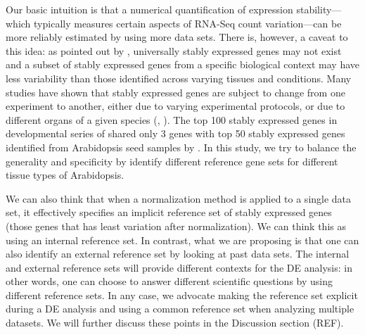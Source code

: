 \documentclass[11pt, a4paper]{article}
\begin{document}
Our basic intuition is that a numerical quantification of expression
stability---which typically measures certain aspects of RNA-Seq count
variation---can be more reliably estimated by using more data sets.  There is,
however, a caveat to this idea: as pointed out by \cite{hruz2011refgenes},
universally stably expressed genes may not exist and a subset of stably
expressed genes from a specific biological context may have less variability
than those identified across varying tissues and conditions.  Many studies
have shown that stably expressed genes are subject to change from one
experiment to another, either due to varying experimental protocols, or due to
different organs of a given species (\cite{reid2006optimized},
\cite{hong2010identification}).  The top 100 stably expressed genes in developmental series of 
\cite{czechowski2005genome} shared only 3 genes with top 50 stably expressed
genes identified from Arabidopsis seed samples by \cite{dekkers2012identification}.  In this
study, we try to balance the generality and specificity by identify different
reference gene sets for different tissue types of Arabidopsis. 

We can also think that when a normalization method is applied to a single data
set, it effectively specifies an implicit reference set of stably expressed
genes (those genes that has least variation after normalization). We can think
this as using an internal reference set. In contrast, what we are proposing is
that one can also identify an external reference set by looking at past data
sets. The internal and external reference sets will provide different contexts
for the DE analysis: in other words, one can choose to answer different
scientific questions by using different reference sets. In any case, we
advocate  making the reference set explicit during a DE analysis and using a
common reference set when analyzing multiple datasets. We will further discuss
these points in the Discussion section (REF).
\end{document}
